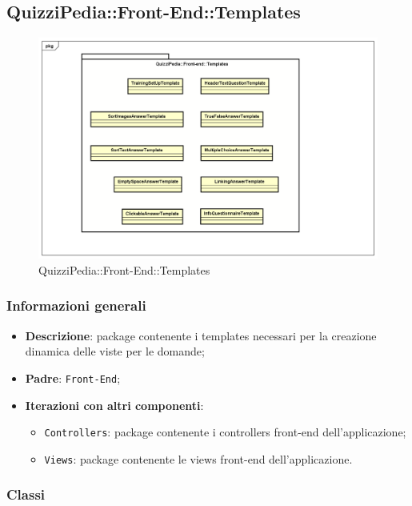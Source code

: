 \newpage

\subsection{QuizziPedia::Front-End::Templates}

	\label{QuizziPedia::Front-End::Templates}

	\begin{figure}[h]
		\centering
		\includegraphics[scale=0.5,keepaspectratio]{UML/Package/QuizziPedia_Front-End_Templates.png}
		\caption{QuizziPedia::Front-End::Templates}
	\end{figure}
	
	\subsubsection{Informazioni generali}
		\begin{itemize}
			\item \textbf{Descrizione}: package contenente i templates necessari per la creazione dinamica delle viste per le domande;
			\item \textbf{Padre}: \texttt{Front-End};
			\item \textbf{Iterazioni con altri componenti}: 
				\begin{itemize}
					\item \texttt{Controllers}: package contenente i controllers front-end dell'applicazione;
					\item \texttt{Views}: package contenente le views front-end dell'applicazione.
				\end{itemize}
		\end{itemize}

	\subsubsection{Classi}
	
